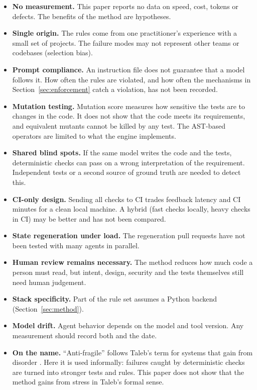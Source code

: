 \documentclass[11pt,a4paper]{article}
\begin{document}
\begin{itemize}
  \item \textbf{No measurement.} This paper reports no data on speed, cost, tokens or defects. The benefits of the method are hypotheses.
  \item \textbf{Single origin.} The rules come from one practitioner's experience with a small set of projects. The failure modes may not represent other teams or codebases (selection bias).
  \item \textbf{Prompt compliance.} An instruction file does not guarantee that a model follows it. How often the rules are violated, and how often the mechanisms in Section~\ref{sec:enforcement} catch a violation, has not been recorded.
  \item \textbf{Mutation testing.} Mutation score measures how sensitive the tests are to changes in the code. It does not show that the code meets its requirements, and equivalent mutants cannot be killed by any test. The AST-based operators are limited to what the engine implements.
  \item \textbf{Shared blind spots.} If the same model writes the code and the tests, deterministic checks can pass on a wrong interpretation of the requirement. Independent tests or a second source of ground truth are needed to detect this.
  \item \textbf{CI-only design.} Sending all checks to CI trades feedback latency and CI minutes for a clean local machine. A hybrid (fast checks locally, heavy checks in CI) may be better and has not been compared.
  \item \textbf{State regeneration under load.} The regeneration pull requests have not been tested with many agents in parallel.
  \item \textbf{Human review remains necessary.} The method reduces how much code a person must read, but intent, design, security and the tests themselves still need human judgement.
  \item \textbf{Stack specificity.} Part of the rule set assumes a Python backend (Section~\ref{sec:method}).
  \item \textbf{Model drift.} Agent behavior depends on the model and tool version. Any measurement should record both and the date.
  \item \textbf{On the name.} ``Anti-fragile'' follows Taleb's term for systems that gain from disorder \cite{taleb2012}. Here it is used informally: failures caught by deterministic checks are turned into stronger tests and rules. This paper does not show that the method gains from stress in Taleb's formal sense.
\end{itemize}
\end{document}
